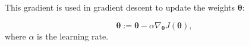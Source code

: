 This gradient is used in gradient descent to update the weights $\boldsymbol{\theta}$:

\[
\boldsymbol{\theta} := \boldsymbol{\theta} - \alpha \nabla_{\boldsymbol{\theta}} J(\boldsymbol{\theta}),
\]
where $\alpha$ is the learning rate.


